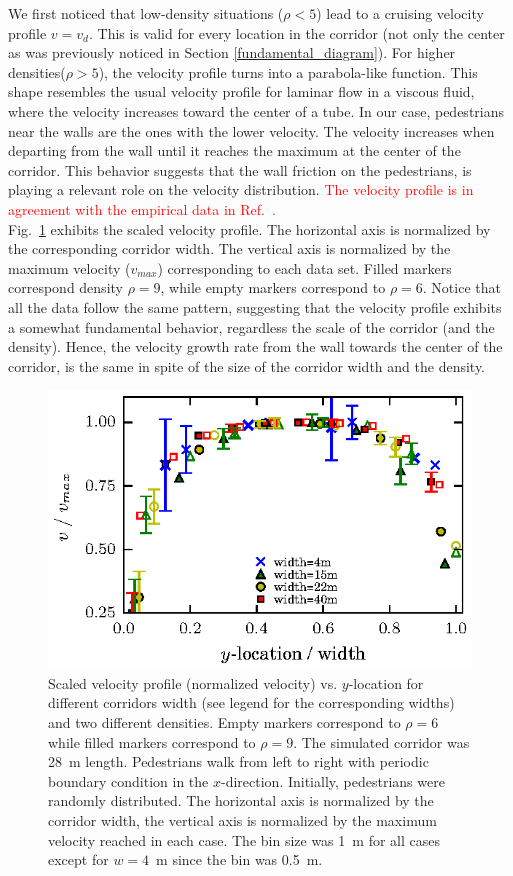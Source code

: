 \documentclass[preprint,12pt]{elsarticle}
\begin{document}
We first noticed that low-density situations ($\rho<5$) lead to a cruising velocity profile $v=v_d$. This is valid for every location in the corridor (not only the center as was previously noticed in Section \ref{fundamental_diagram}). For higher densities($\rho>5$), the velocity profile turns into a parabola-like function. This shape resembles the usual velocity profile for laminar flow in a viscous fluid, where the velocity increases toward the center of a tube. In our case, pedestrians near the walls are the ones with the lower velocity. The velocity increases when departing from the wall until it reaches the maximum at the center of the corridor. This behavior suggests that the wall friction on the pedestrians, is playing a relevant role on the velocity distribution. \textcolor{red}{The velocity profile is in agreement with the empirical data in Ref.~\cite{zhang1}.}  \\

Fig.~\ref{speed-profile-width-normaliz} exhibits the scaled velocity profile. The horizontal axis is normalized by the corresponding corridor width. The vertical axis is normalized by the maximum velocity ($v_{max}$) corresponding to each data set. Filled markers correspond density $\rho=9$, while empty markers correspond to $\rho=6$. Notice that all the data follow the same  pattern, suggesting that the velocity profile exhibits a somewhat fundamental behavior, regardless the scale of the corridor (and the density). Hence, the velocity growth rate from the wall towards the center of the corridor, is the same in spite of the size of the corridor width and the density. \\

\begin{figure}[htbp!]
\centering
\includegraphics[width=0.7\columnwidth]
{./v_y_multi_width_normaliz.eps}
\caption{\label{speed-profile-width-normaliz} Scaled velocity profile (normalized velocity) vs. $y$-location for different corridors width (see legend for the corresponding widths) and two different densities. Empty markers correspond to $\rho=6$ while filled markers correspond to  $\rho=9$. The simulated corridor was 28~m length. Pedestrians walk from left to right with periodic boundary condition in the $x$-direction. Initially, pedestrians were randomly distributed. The horizontal axis is normalized by the corridor width, the vertical axis is normalized by the maximum velocity reached in each case.  The bin size was 1~m for all cases except for $w=4$~m since the bin was 0.5~m.}
\end{figure}
\end{document}
